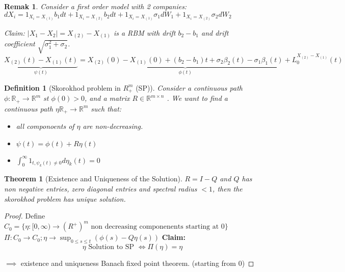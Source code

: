 \documentclass{article} \usepackage[utf8]{inputenc}
\newtheorem{theorem}{Theorem}
\newtheorem{definition}{Definition}
\newtheorem{remark}{Remak}
\begin{document}
  \begin{remark}

    Consider a first order model with 2 companies:
    $dX_i = 1_{X_i = X_(1)} b_1 dt + 1_{X_i = X_(2)} b_2 dt + 1_{X_i = X_(1)} \sigma_1 dW_1 + 1_{X_i = X_(2)} \sigma_2 dW_2$

    Claim: $|X_1 - X_2| = X_{(2)} - X_{(1)}$ is a RBM with drift $b_2 - b_1$ and drift coefficient $\sqrt{\sigma_1^2 + \sigma_2}$.
    $\underbrace{X_{(2)}(t) - X_{(1)}(t)}_{\psi(t)} = \underbrace{X_{(2)}(0) - X_{(1)}(0) + (b_2 - b_1)t + \sigma_2 \beta_2(t) - \sigma_1 \beta_1(t)}_{\phi(t)} + L_0^{X_{(2)} - X_{(1)}}(t)$
    
  \end{remark}
  \begin{definition}[Skorokhod problem in $R_+^m$ (SP)]
    Consider a continuous path $\phi: \mathbb R_+ \rightarrow \mathbb R^m$ st $\phi(0) > 0$, and a matrix $R \in \mathbb R^{m \times n}$
    . We want to find a continuous path $\eta \mathbb R_+ \rightarrow \mathbb R^m$ such that:
    \begin{itemize}
    \item all componoents of $\eta$ are non-decreasing.
    \item $\psi(t) = \phi(t) + R \eta(t)$
    \item  $\int_0^{\infty} 1_{t, \psi_k(t) \ne 0} d\eta_k(t) = 0$
    \end{itemize}
  \end{definition}
  \begin{theorem}[Existence and Uniqueness of the Solution]
    $R = I - Q$ and $Q$ has non negative entries, zero diagonal entries and spectral radius $<1$, then the skorokhod problem has unique solution. 
  \end{theorem}
  \begin{proof}
    Define $C_0 = \{ \eta: [0, \infty) \rightarrow (R^+)^m \text{ non decreasing componenents starting at } 0\}$
    $\Pi: C_0 \rightarrow C_0; \eta \rightarrow \sup_{0 \le s \le t} (\phi(s) - Q\eta(s))$
    \textbf{Claim:}
    $$\eta \text{ Solution to SP } \iff \Pi(\eta) = \eta$$

    $\implies$ existence and uniqueness Banach fixed point theorem. (starting from 0)
  \end{proof}
\end{document}
